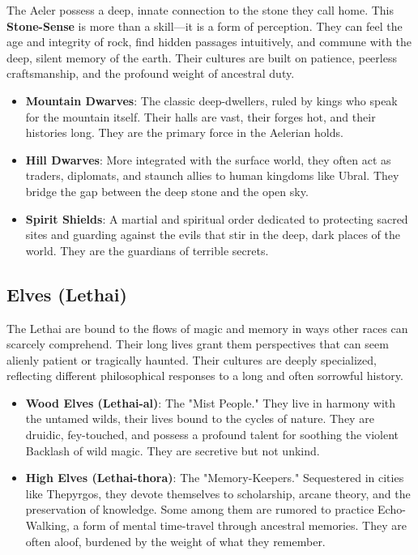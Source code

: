 The Aeler possess a deep, innate connection to the stone they call home. This \textbf{Stone-Sense} is more than a skill—it is a form of perception. They can feel the age and integrity of rock, find hidden passages intuitively, and commune with the deep, silent memory of the earth. Their cultures are built on patience, peerless craftsmanship, and the profound weight of ancestral duty.

\begin{itemize}
    \item \textbf{Mountain Dwarves}: The classic deep-dwellers, ruled by kings who speak for the mountain itself. Their halls are vast, their forges hot, and their histories long. They are the primary force in the Aelerian holds.
    \item \textbf{Hill Dwarves}: More integrated with the surface world, they often act as traders, diplomats, and staunch allies to human kingdoms like Ubral. They bridge the gap between the deep stone and the open sky.
    \item \textbf{Spirit Shields}: A martial and spiritual order dedicated to protecting sacred sites and guarding against the evils that stir in the deep, dark places of the world. They are the guardians of terrible secrets.
\end{itemize}

\subsection*{Elves (Lethai)}

The Lethai are bound to the flows of magic and memory in ways other races can scarcely comprehend. Their long lives grant them perspectives that can seem alienly patient or tragically haunted. Their cultures are deeply specialized, reflecting different philosophical responses to a long and often sorrowful history.

\begin{itemize}
    \item \textbf{Wood Elves (Lethai-al)}: The "Mist People." They live in harmony with the untamed wilds, their lives bound to the cycles of nature. They are druidic, fey-touched, and possess a profound talent for soothing the violent Backlash of wild magic. They are secretive but not unkind.
    \item \textbf{High Elves (Lethai-thora)}: The "Memory-Keepers." Sequestered in cities like Thepyrgos, they devote themselves to scholarship, arcane theory, and the preservation of knowledge. Some among them are rumored to practice Echo-Walking, a form of mental time-travel through ancestral memories. They are often aloof, burdened by the weight of what they remember.
\end{itemize}

